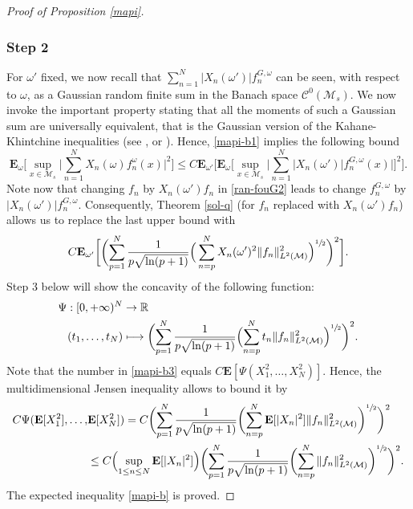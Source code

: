 \documentclass[JEP,XML,SOM,Unicode,NoEqCountersInSection,published]{cedram}
\def\mto{\mathchoice{\longmapsto}{\mapsto}{\mapsto}{\mapsto}}
\theoremstyle{theorem}
\theoremstyle{definition}
\newcommand\R{\mathbb{R}}
\newcommand\E{\mathbf{E}}
\newcommand\CC{\mathcal{C}}
\begin{document}
\begin{proof}[Proof of Proposition \ref{mapi}]
\subsubsection*{Step 2}
For $\omega'$ fixed, we now recall that $\sum_{n=1}^N |X_n(\omega')| f_n^{G,\omega}$ can be seen, with respect to $\omega$, as a Gaussian random finite sum in the Banach space $\CC^0(\mathcal{M}_s)$.
We now invoke the important property stating that all the moments of such a Gaussian sum are universally equivalent, that is the Gaussian version of the Kahane-Khintchine inequalities (see \cite[Cor.\,3.2]{ledoux}, \cite[p.\,44]{pisier1981} or \cite[p.\,256, Cor.\,V.27]{queff1}).
Hence, \eqref{mapi-b1} implies the following bound
\begin{equation*}
\E_{\omega}\biggl[\sup_{x\in \mathcal{M}_s}\Big|\sum_{n=1}^N X_n(\omega)f_n^{\omega}(x)\Big|^{2} \biggr]\leq C\E_{\omega'}\biggl[\E_{\omega}\biggl[\sup_{x\in \mathcal{M}_s}\Big| \sum_{n=1}^N |X_n(\omega')| f_n^{G,\omega}(x) \Big| \biggr]^2 \biggr].
\end{equation*}
Note now that changing $f_n$ by $X_n(\omega')f_n$ in \eqref{ran-fouG2} leads to change $f_n^{G,\omega}$ by $|X_n(\omega')| f_n^{G,\omega}$.
Consequently, Theorem \ref{sol-q} (for $f_n$ replaced with $X_n(\omega')f_n$) allows us to replace the last upper bound with
\begin{equation}\label{mapi-b3}
C\E_{\omega'}\biggl[\biggl(\sum_{p=1}^N \frac{1}{p\sqrt{\ln(p+1)}}\Big(\sum_{n=p}^{N} X_n(\omega')^2\|f_n\|_{L^2(\mathcal{M})}^2 \Big)^{\sfrac{1}{2}}\biggr)^2\biggr].
\end{equation}
Step 3 below will show the concavity of the following function:
\begin{equation}\label{concav}
\begin{split}
\Psi: [0,+\infty)^N & \to\R \\
(t_1,\dots,t_N) & \mto \biggl(\sum_{p=1}^N \frac{1}{p\sqrt{\ln(p+1)}}\Bigl(\sum_{n=p}^{N} t_n \|f_n\|_{L^2(\mathcal{M})}^2 \Bigr)^{\sfrac{1}{2}}\biggr)^2.
\end{split}
\end{equation}
Note that the number in \eqref{mapi-b3} equals $C \E[\Psi(X_1^2,\dots,X_N^2)]$.
Hence, the multidimensional Jensen inequality allows to bound it by
\begin{align*}
C \Psi(\E[X_1^2],\dots,&\E[X_N^2])
=C\biggl(\sum_{p=1}^N \frac{1}{p\sqrt{\ln(p+1)}}\biggl(\sum_{n=p}^{N} \E[| X_n|^2]\|f_n\|_{L^2(\mathcal{M})}^2 \biggr)^{\sfrac{1}{2}}\biggr)^2\\
&\leq C \Bigl(\sup_{1\leq n\leq N} \E[|X_n|^2] \Bigr)
\biggl(\sum_{p=1}^N \frac{1}{p\sqrt{\ln(p+1)}}\biggl(\sum_{n=p}^{N} \|f_n\|_{L^2(\mathcal{M})}^2 \biggr)^{\sfrac{1}{2}}\biggr)^2.
\end{align*}
The expected inequality \eqref{mapi-b} is proved.


\end{proof}
\end{document}
